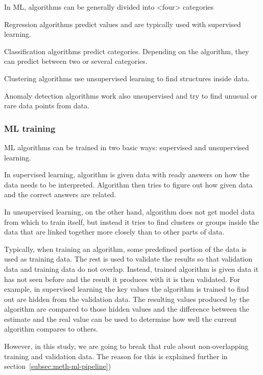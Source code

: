 In ML, 
algorithms can be generally divided into <four> categories %

Regression algorithms predict values
and are typically used with supervised learning.

Classification algorithms predict categories.
Depending on the algorithm,
they can predict between two or several categories.

Clustering algorithms use unsupervised learning
to find structures inside data.

Anomaly detection algorithms work also unsupervised
and try to find unusual or rare data points from data.


\subsubsection*{ML training}
ML algorithms can be trained in two basic ways:
supervised and unsupervised learning.

In supervised learning,
algorithm is given data with ready answers on
how the data needs to be interpreted.
Algorithm then tries to figure out
how given data and the correct answers are related.

In unsupervised learning,
on the other hand,
algorithm does not get model data from which to train itself,
but instead it tries to find clusters or groups inside the data
that are linked together more closely than to other parts of data.

Typically,
when training an algorithm,
some predefined portion of the data
is used as training data.
The rest is used to validate the results
so that validation data and training data do not overlap.
Instead, trained algorithm is given data it has not seen before
and the result it produces with it is then validated.
For example,
in supervised learning
the key values the algorithm is trained to find out
are hidden from the validation data.
The resulting values produced by the algorithm
are compared to those hidden values
and the difference between the estimate and the real value
can be used to determine how well the current algorithm compares to others.

However, in this study,
we are going to break that rule
about non-overlapping training and validation data.
The reason for this is explained further in section~\ref{subsec:meth-ml-pipeline})


